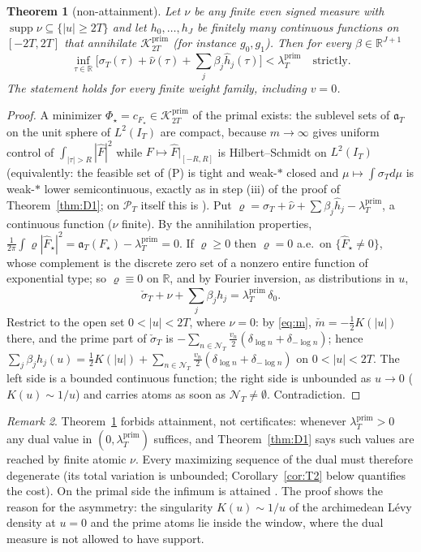 \documentclass[11pt]{amsart}
\newtheorem{theorem}{Theorem}[section]
\theoremstyle{definition}
\theoremstyle{remark}
\newtheorem{remark}[theorem]{Remark}
\newcommand{\R}{\mathbb R}
\newcommand{\supp}{\operatorname{supp}}
\newcommand{\Kp}{\mathcal K^{\mathrm{prim}}_{2T}}
\newcommand{\PT}{\mathcal P_T}
\newcommand{\IT}{I_T}
\newcommand{\lamP}{\lambda^{\mathrm{prim}}_T}
\newcommand{\sT}{\sigma_T}
\newcommand{\nuh}{\widehat\nu}
\newcommand{\Fh}{\widehat F}
\newcommand{\NT}{\mathcal N_T}
\begin{document}
\begin{theorem}[non-attainment]\label{thm:O}
Let $\nu$ be any finite even signed measure with $\supp\nu\subseteq\{|u|\ge2T\}$ and let
$h_0,\dots,h_J$ be finitely many continuous functions on $[-2T,2T]$ that annihilate $\Kp$
(for instance $g_0,g_1$). Then for every $\beta\in\R^{J+1}$
\[
\inf_{\tau\in\R}\Big[\sT(\tau)+\nuh(\tau)+\sum_j\beta_j\widehat h_j(\tau)\Big]<\lamP\quad\text{strictly.}
\]
The statement holds for every finite weight family, including $v=0$.
\end{theorem}
\begin{proof}
A minimizer $\Phi_\star=c_{F_\star}\in\Kp$ of the primal exists: the sublevel sets of
$\mathfrak a_T$ on the unit sphere of $L^2(\IT)$ are compact, because $m\to\infty$ gives uniform
control of $\int_{|\tau|>R}|\Fh|^2$ while $F\mapsto\Fh|_{[-R,R]}$ is Hilbert--Schmidt on $L^2(\IT)$
(equivalently: the feasible set of (P) is tight and weak-$*$ closed and $\mu\mapsto\int\sT d\mu$ is
weak-$*$ lower semicontinuous, exactly as in step (iii) of the proof of Theorem~\ref{thm:D1}; on
$\PT$ itself this is \cite[Thm.~3]{Bombieri2000}). Put $\varrho=\sT+\nuh+\sum\beta_j\widehat h_j-\lamP$, a
continuous function ($\nu$ finite). By the annihilation properties,
$\frac1{2\pi}\int\varrho|\Fh_\star|^2=\mathfrak a_T(F_\star)-\lamP=0$. If $\varrho\ge0$ then $\varrho=0$ a.e.\ on
$\{\Fh_\star\ne0\}$, whose complement is the discrete zero set of a nonzero entire function of
exponential type; so $\varrho\equiv0$ on $\R$, and by Fourier inversion, as distributions in $u$,
\[
\check\sT+\nu+\sum_j\beta_jh_j=\lamP\,\delta_0 .
\]
Restrict to the open set $0<|u|<2T$, where $\nu=0$: by \eqref{eq:m}, $\check m=-\frac12K(|u|)$
there, and the prime part of $\check\sT$ is $-\sum_{n\in\NT}\frac{v_n}2(\delta_{\log n}+\delta_{-\log n})$;
hence $\sum_j\beta_jh_j(u)=\frac12K(|u|)+\sum_{n\in\NT}\frac{v_n}2(\delta_{\log n}+\delta_{-\log n})$
on $0<|u|<2T$. The left side is a bounded continuous function; the right side is unbounded as
$u\to0$ ($K(u)\sim1/u$) and carries atoms as soon as $\NT\neq\emptyset$. Contradiction.
\end{proof}

\begin{remark}\label{rem:OvsB}
Theorem~\ref{thm:O} forbids attainment, not certificates: whenever $\lamP>0$ any dual value in
$(0,\lamP)$ suffices, and Theorem~\ref{thm:D1} says such values are reached by finite atomic
$\nu$. Every maximizing sequence of the dual must therefore degenerate (its total variation is
unbounded; Corollary~\ref{cor:T2} below quantifies the cost). On the primal side the infimum is
attained \cite[Thm.~3]{Bombieri2000}. The proof shows the reason for the asymmetry: the
singularity $K(u)\sim1/u$ of the archimedean L\'evy density at $u=0$ and the prime atoms lie inside
the window, where the dual measure is not allowed to have support.
\end{remark}
\end{document}
